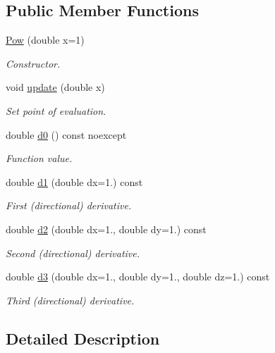\subsection*{Public Member Functions}
\begin{DoxyCompactItemize}
\item 
\hyperlink{structFunG_1_1Pow_a80be1d3a5c208e7ac74efa7ff3a7a18f}{Pow} (double x=1)
\begin{DoxyCompactList}\small\item\em Constructor. \end{DoxyCompactList}\item 
void \hyperlink{structFunG_1_1Pow_a2cb004b3cb89c4887b67eb8e666f4852}{update} (double x)
\begin{DoxyCompactList}\small\item\em Set point of evaluation. \end{DoxyCompactList}\item 
double \hyperlink{structFunG_1_1Pow_a840ccc0dbcfabc71863d2932074b955a}{d0} () const noexcept
\begin{DoxyCompactList}\small\item\em Function value. \end{DoxyCompactList}\item 
double \hyperlink{structFunG_1_1Pow_a9e1301ef812a58af196556bc2b33b7c0}{d1} (double dx=1.) const 
\begin{DoxyCompactList}\small\item\em First (directional) derivative. \end{DoxyCompactList}\item 
double \hyperlink{structFunG_1_1Pow_ac3b7b762a8609b5c2ea57831acd04870}{d2} (double dx=1., double dy=1.) const 
\begin{DoxyCompactList}\small\item\em Second (directional) derivative. \end{DoxyCompactList}\item 
double \hyperlink{structFunG_1_1Pow_a5ad0887482ea7a9f146d9dc41742c11a}{d3} (double dx=1., double dy=1., double dz=1.) const 
\begin{DoxyCompactList}\small\item\em Third (directional) derivative. \end{DoxyCompactList}\end{DoxyCompactItemize}


\subsection{Detailed Description}
